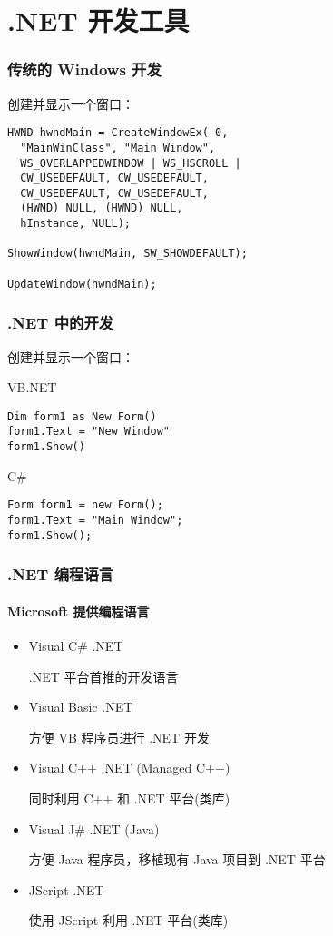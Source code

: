 
\section{.NET 开发工具}

\begin{frame}[fragile]
\frametitle{传统的 Windows 开发}

\CJKindent 创建并显示一个窗口：

\lstset{language=C}
\begin{lstlisting}
HWND hwndMain = CreateWindowEx( 0,
  "MainWinClass", "Main Window",
  WS_OVERLAPPEDWINDOW | WS_HSCROLL |
  CW_USEDEFAULT, CW_USEDEFAULT,
  CW_USEDEFAULT, CW_USEDEFAULT,
  (HWND) NULL, (HWND) NULL,
  hInstance, NULL);

ShowWindow(hwndMain, SW_SHOWDEFAULT);

UpdateWindow(hwndMain);
\end{lstlisting}

\end{frame}

\begin{frame}[fragile]
\frametitle{.NET 中的开发}
创建并显示一个窗口：

VB.NET
\lstset{defaultdialect=[Visual]Basic,language=Basic}
\begin{lstlisting}
Dim form1 as New Form()
form1.Text = "New Window"
form1.Show()
\end{lstlisting}

C\#
\lstset{language=CSharp}
\begin{lstlisting}
Form form1 = new Form();
form1.Text = "Main Window";
form1.Show();
\end{lstlisting}
\end{frame}

\begin{frame}
\frametitle{.NET 编程语言}
\framesubtitle{Microsoft 提供编程语言}

\begin{itemize}
  \CJKindent
\item Visual C\# .NET  \par
  \smallskip \small .NET 平台首推的开发语言
\item Visual Basic .NET \par
  \smallskip \small 方便 VB 程序员进行 .NET 开发
\item Visual C++ .NET (Managed C++) \par
  \smallskip \small 同时利用 C++ 和 .NET 平台(类库)
\item Visual J\# .NET (Java) \par
  \smallskip \small 方便 Java 程序员，移植现有 Java 项目到 .NET 平台
\item JScript .NET \par
  \smallskip \small 使用 JScript 利用 .NET 平台(类库)
\end{itemize}
\end{frame}

